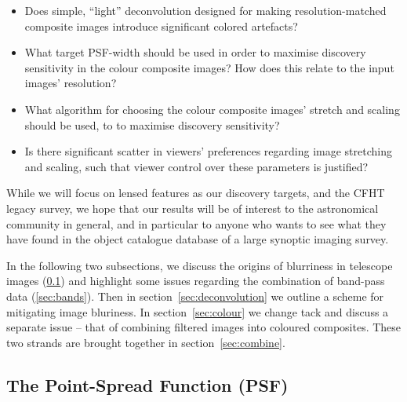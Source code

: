 \documentclass[letterpaper, 11pt]{article}
\begin{document}
\begin{itemize}

	\item Does simple, ``light'' deconvolution designed for making
resolution-matched composite images introduce significant colored artefacts?

	\item What target PSF-width should be used in order to
maximise discovery sensitivity in the colour composite images? How does this
relate to the input images' resolution?

	\item What algorithm for choosing the colour composite images' stretch and
scaling should be used, to to maximise discovery sensitivity? 

	\item Is there significant scatter in viewers' preferences regarding image
stretching and scaling, such that viewer control over these parameters is
justified?

\end{itemize}

While we will focus on lensed features as our discovery targets, and the CFHT legacy
survey, we hope that our results will be of interest to the astronomical
community in general, and in particular to anyone who wants to see what they
have found in the object catalogue database of a large synoptic imaging survey.

In the following two subsections, we discuss the origins of blurriness in telescope images (\ref{sec:psf}) and highlight some issues regarding the combination of band-pass data (\ref{sec:bands}). Then in section~\ref{sec:deconvolution} we outline a scheme for mitigating image bluriness. In section~\ref{sec:colour} we change tack and discuss a separate issue -- that of combining filtered images into coloured composites. These two strands are brought together in section~\ref{sec:combine}.


\subsection{The Point-Spread Function (PSF)}
\label{sec:psf}
\end{document}
